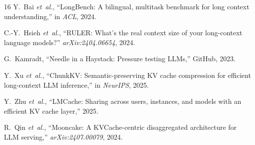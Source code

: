 \documentclass[conference]{IEEEtran}
\begin{document}
\begin{thebibliography}{16}
Y.~Bai \textit{et~al.}, ``LongBench: A bilingual, multitask benchmark for long context understanding,'' in \textit{ACL}, 2024.

C.-Y.~Hsieh \textit{et~al.}, ``RULER: What's the real context size of your long-context language models?'' \textit{arXiv:2404.06654}, 2024.

G.~Kamradt, ``Needle in a Haystack: Pressure testing LLMs,'' GitHub, 2023.

Y.~Xu \textit{et~al.}, ``ChunkKV: Semantic-preserving KV cache compression for efficient long-context LLM inference,'' in \textit{NeurIPS}, 2025.

Y.~Zhu \textit{et~al.}, ``LMCache: Sharing across users, instances, and models with an efficient KV cache layer,'' 2025.

R.~Qin \textit{et~al.}, ``Mooncake: A KVCache-centric disaggregated architecture for LLM serving,'' \textit{arXiv:2407.00079}, 2024.

\end{thebibliography}
\end{document}
